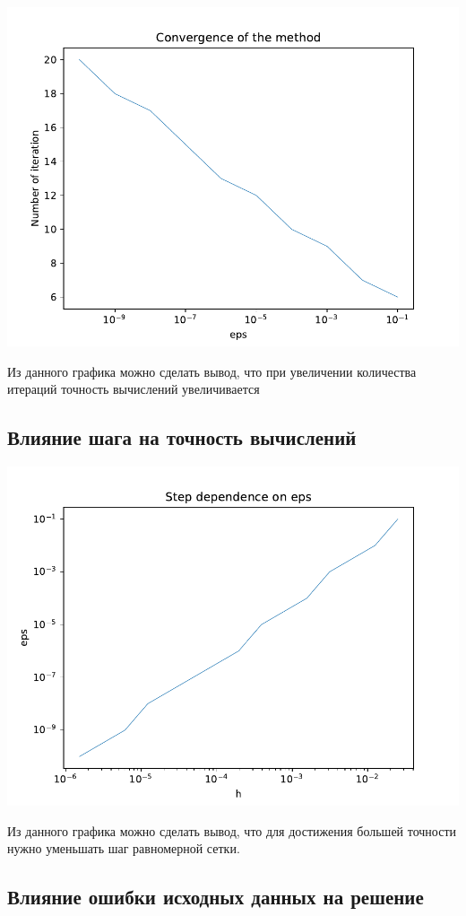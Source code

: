 \includegraphics[scale=0.75]{1.pdf}

Из данного графика можно сделать вывод, что при увеличении количества итераций точность вычислений увеличивается

\subsection{Влияние шага на точность вычислений}

\includegraphics[scale=0.75]{2.pdf}

Из данного графика можно сделать вывод, что для достижения большей точности нужно уменьшать шаг равномерной сетки.

\subsection{Влияние ошибки исходных данных на решение}

